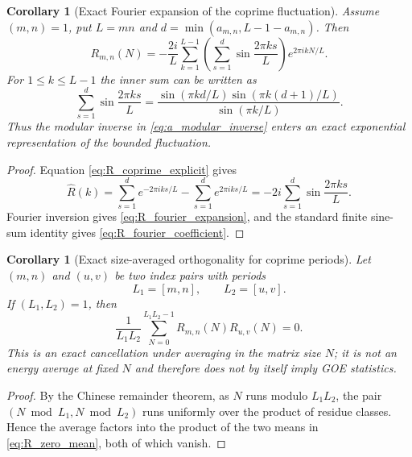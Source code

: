 \documentclass[11pt]{amsart}
\numberwithin{equation}{section}
\theoremstyle{plain}
\newtheorem{corollary}[theorem]{Corollary}
\theoremstyle{definition}
\theoremstyle{remark}
\begin{document}
\begin{corollary}[Exact Fourier expansion of the coprime fluctuation]
\label{cor:R_fourier}
Assume $(m,n)=1$, put $L=mn$ and $d=\min(a_{m,n},L-1-a_{m,n})$.  Then
\begin{equation}
R_{m,n}(N)
=-\frac{2i}{L}\sum_{k=1}^{L-1}
\left(\sum_{s=1}^{d}\sin\frac{2\pi ks}{L}\right)
 e^{2\pi i kN/L}.
\label{eq:R_fourier_expansion}
\end{equation}
For $1\le k\le L-1$ the inner sum can be written as
\begin{equation}
\sum_{s=1}^{d}\sin\frac{2\pi ks}{L}
=
\frac{
\sin(\pi kd/L)\sin(\pi k(d+1)/L)
}{\sin(\pi k/L)}.
\label{eq:R_fourier_coefficient}
\end{equation}
Thus the modular inverse in \eqref{eq:a_modular_inverse} enters an exact exponential representation of the bounded fluctuation.
\end{corollary}

\begin{proof}
Equation \eqref{eq:R_coprime_explicit} gives
\begin{equation}
\widehat R(k)
=\sum_{s=1}^{d}e^{-2\pi iks/L}
 -\sum_{s=1}^{d}e^{2\pi iks/L}
=-2i\sum_{s=1}^{d}\sin\frac{2\pi ks}{L}.
\end{equation}
Fourier inversion gives \eqref{eq:R_fourier_expansion}, and the standard finite sine-sum identity gives \eqref{eq:R_fourier_coefficient}.
\end{proof}

\begin{corollary}[Exact size-averaged orthogonality for coprime periods]
\label{cor:R_period_orthogonality}
Let $(m,n)$ and $(u,v)$ be two index pairs with periods
\begin{equation}
L_1=[m,n],
\qquad L_2=[u,v].
\end{equation}
If $(L_1,L_2)=1$, then
\begin{equation}
\frac1{L_1L_2}
\sum_{N=0}^{L_1L_2-1}
R_{m,n}(N)R_{u,v}(N)=0.
\label{eq:R_period_orthogonality}
\end{equation}
This is an exact cancellation under averaging in the matrix size $N$; it is not an energy average at fixed $N$ and therefore does not by itself imply GOE statistics.
\end{corollary}

\begin{proof}
By the Chinese remainder theorem, as $N$ runs modulo $L_1L_2$, the pair $(N\bmod L_1,N\bmod L_2)$ runs uniformly over the product of residue classes.  Hence the average factors into the product of the two means in \eqref{eq:R_zero_mean}, both of which vanish.
\end{proof}
\end{document}
